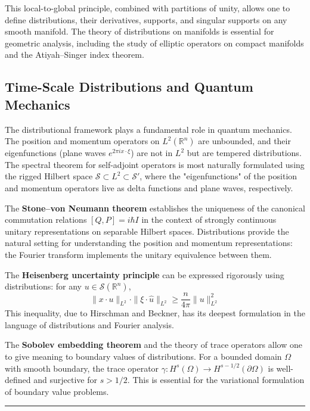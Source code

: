 This local-to-global principle, combined with partitions of unity, allows one to define distributions, their derivatives, supports, and singular supports on any smooth manifold. The theory of distributions on manifolds is essential for geometric analysis, including the study of elliptic operators on compact manifolds and the Atiyah--Singer index theorem.

\subsection*{Time-Scale Distributions and Quantum Mechanics}

The distributional framework plays a fundamental role in quantum mechanics. The position and momentum operators on $L^2(\mathbb{R}^n)$ are unbounded, and their eigenfunctions (plane waves $e^{2\pi i x \cdot \xi}$) are not in $L^2$ but are tempered distributions. The spectral theorem for self-adjoint operators is most naturally formulated using the rigged Hilbert space $\mathcal{S} \subset L^2 \subset \mathcal{S}'$, where the "eigenfunctions" of the position and momentum operators live as delta functions and plane waves, respectively.

The \textbf{Stone--von Neumann theorem} establishes the uniqueness of the canonical commutation relations $[Q, P] = i\hbar I$ in the context of strongly continuous unitary representations on separable Hilbert spaces. Distributions provide the natural setting for understanding the position and momentum representations: the Fourier transform implements the unitary equivalence between them.

The \textbf{Heisenberg uncertainty principle} can be expressed rigorously using distributions: for any $u \in \mathcal{S}(\mathbb{R}^n)$,
\[\|x \cdot u\|_{L^2} \cdot \|\xi \cdot \hat{u}\|_{L^2} \geq \frac{n}{4\pi} \|u\|_{L^2}^2\]
This inequality, due to Hirschman and Beckner, has its deepest formulation in the language of distributions and Fourier analysis.

The \textbf{Sobolev embedding theorem} and the theory of trace operators allow one to give meaning to boundary values of distributions. For a bounded domain $\Omega$ with smooth boundary, the trace operator $\gamma: H^s(\Omega) \to H^{s-1/2}(\partial\Omega)$ is well-defined and surjective for $s > 1/2$. This is essential for the variational formulation of boundary value problems.

\begin{center}\rule{0.5\linewidth}{0.5pt}\end{center}

